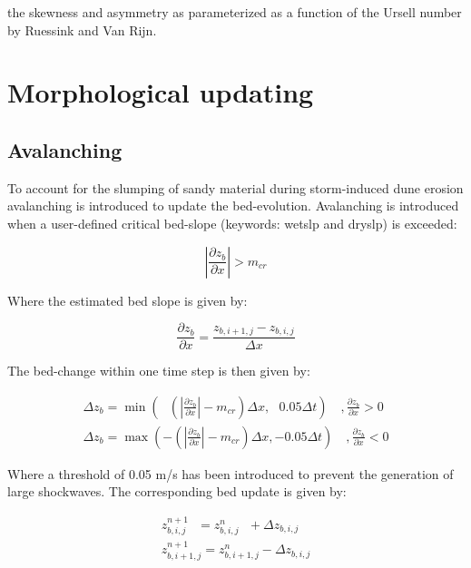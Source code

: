 the skewness and asymmetry as parameterized as a function of the Ursell number by Ruessink  and Van Rijn.

\section{ Morphological updating}
\subsection{ Avalanching}

To account for the slumping of sandy material during storm-induced dune erosion avalanching is introduced to update the bed-evolution. Avalanching is introduced when a user-defined critical bed-slope (keywords: wetslp and dryslp) is exceeded:

\begin{equation} \label{2.69)} 
\left|\frac{\partial z_{b} }{\partial x} \right|>m_{cr}  
\end{equation} 

Where the estimated bed slope is given by:

\begin{equation} \label{2.70)} 
\frac{\partial z_{b} }{\partial x} =\frac{z_{b,i+1,j} -z_{b,i,j} }{\Delta x}  
\end{equation} 

The bed-change within one time step is then given by:

\begin{equation} \label{2.71)} 
\begin{array}{l} {\Delta z_{b} =\min \left(\, \, \, \, \left(\left|\frac{\partial z_{b} }{\partial x} \right|-m_{cr} \right)\Delta x,\, \, \, \, 0.05\Delta t\right)\quad ,\frac{\partial z_{b} }{\partial x} >0} \\ {\Delta z_{b} =\max \left(-\left(\left|\frac{\partial z_{b} }{\partial x} \right|-m_{cr} \right)\Delta x,-0.05\Delta t\right)\quad ,\frac{\partial z_{b} }{\partial x} <0} \end{array} 
\end{equation} 

Where a threshold of 0.05 m/s has been introduced to prevent the generation of large shockwaves. The corresponding bed update is given by:

\begin{equation} \label{2.72)} 
\begin{array}{l} {z_{b,i,j}^{n+1} \, \, \, \, =z_{b,i,j}^{n} \, \, \, \, +\Delta z_{b,i,j} } \\ {z_{b,i+1,j}^{n+1} =z_{b,i+1,j}^{n} -\Delta z_{b,i,j} } \end{array} 
\end{equation} 

